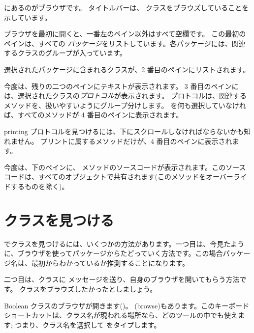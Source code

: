 \documentclass[a4paper,10pt,twoside]{book}
\begin{document}
 にあるのがブラウザです。
タイトルバーは、 クラスをブラウズしていることを示しています。

ブラウザを最初に開くと、一番左のペイン以外はすべて空欄です。
この最初のペインは、すべての \emph{パッケージ}をリストしています。各パッケージには、関連するクラスのグループが入っています。

選択されたパッケージに含まれるクラスが、2 番目のペインにリストされます。

今度は、残りの二つのペインにテキストが表示されます。
3 番目のペインには、選択されたクラスの\emph{プロトコル}が表示されます。
プロトコルは、関連するメソッドを、扱いやすいようにグループ分けします。
を何も選択していなければ、すべてのメソッドが 4 番目のペインに表示されます。

printing プロトコルを見つけるには、下にスクロールしなければならないかも知れません。
プリントに属するメソッドだけが、4 番目のペインに表示されます。

今度は、下のペインに、 メソッドのソースコードが表示されます。このソースコードは、すべてのオブジェクトで共有されます(このメソッドをオーバーライドするものを除く)。

\section{クラスを見つける}

\pharo でクラスを見つけるには、いくつかの方法があります。一つ目は、今見たように、ブラウザを使ってパッケージからたどっていく方法です。この場合パッケージ名は、最初からわかっているか推測することになります。

二つ目は、クラスに メッセージを送り、自身のブラウザを開いてもらう方法です。 クラスをブラウズしたかったとしましょう。

Boolean クラスのブラウザが開きます()。
  (browse)もあります。このキーボードショートカットは、クラス名が現われる場所なら、どのツールの中でも使えます;
つまり、クラス名を選択して  をタイプします。
\end{document}
